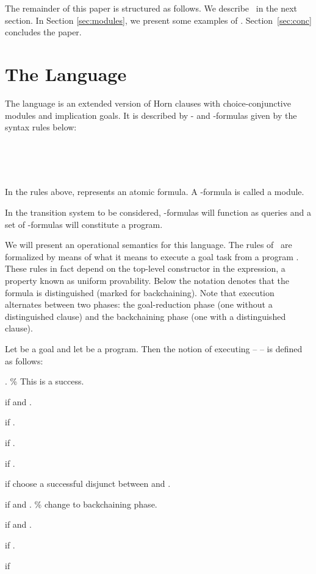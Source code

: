 \documentclass[12pt]{article}
\begin{document}
The remainder of this paper is structured as follows. We describe \hweb\
 in
the next section. In Section \ref{sec:modules}, we
present some examples of \hweb.
Section~\ref{sec:conc} concludes the paper.


\section{The Language}\label{sec:logic}

The language is an extended  version of Horn clauses
 with choice-conjunctive modules and implication goals. It is described
by - and -formulas given by the syntax rules below:
\begin{exmple}
\> \>    \\   \\
\> \>  \\
\end{exmple}
\noindent
In the rules above,   
  represents an atomic formula.
A -formula  is called a  
   module. 
 
In the transition system to be considered, -formulas will function as 
queries and a set of -formulas will constitute  a program. 

 We will  present an operational 
semantics for this language. The rules of \hweb\ are formalized by means of what it means to
execute a goal task  from a program .
These rules in fact depend on the top-level 
constructor in the expression,  a property known as
uniform provability\cite{Mil89jlp,MNPS91}. Below the notation  denotes
that the  formula is distinguished
(marked for backchaining). Note that execution  alternates between 
two phases: the goal-reduction phase (one  without a distinguished clause)
and the backchaining phase (one with a distinguished clause).

\begin{defn}\label{def:semantics}
Let  be a goal and let  be a program.
Then the notion of   executing  --  -- 
 is defined as follows:
\begin{numberedlist}

\item  . \% This is a success.

\item     if 
  and  .

\item     if   .

\item     if   .

\item     if   .

\item     if  choose a successful disjunct between   and
 . 

\item     if    and . \%  change to backchaining phase.

\item    if   and
  .

\item   if .

\item  if 


\end{numberedlist}
\end{defn}
\end{document}
